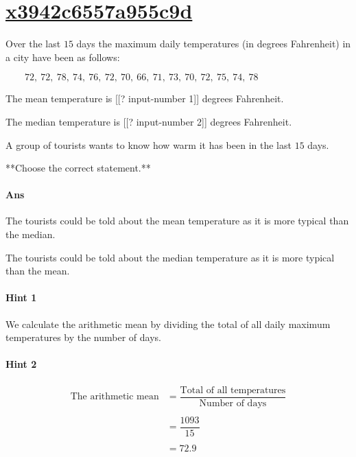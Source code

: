 \documentclass[twocolumn,10pt]{article}
\begin{document}
\section{\href{https://www.khanacademy.org/devadmin/content/items/x3942c6557a955c9d}{x3942c6557a955c9d}}

\noindent
Over the last $15$ days the maximum daily temperatures (in degrees Fahrenheit) in a city have been as follows:

$\qquad72,~72,~78,~74,~76,~72,~70,~66,~71,~73,~70,~72,~75,~74,~78$

The mean temperature is [[? input-number 1]] degrees Fahrenheit.

The median temperature is [[? input-number 2]] degrees Fahrenheit.

A group of tourists wants to know how warm it has been in the last $15$ days.

**Choose the correct statement.**


\paragraph{Ans} 

The tourists could be told about the mean temperature as it is more typical than the median.

The tourists could be told about the median temperature as it is more typical than the mean.


 

\paragraph{Hint 1}We calculate the arithmetic mean by dividing the total of all daily maximum temperatures by the number of days.

\paragraph{Hint 2}\begin{align*}\text{The arithmetic mean} &= \dfrac{\text{Total of all temperatures}}{\text{Number of days}}\\ 
\\
&= \dfrac{1093}{15}\\
\\
&=72.9\end{align*}
\end{document}
